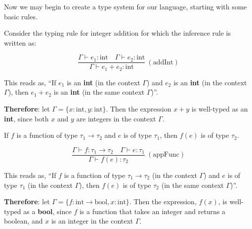 \noindent
Now we may begin to create a type system for our language, starting with some basic rules.
\begin{Example}

    \label{ex:integer_addition}
    Consider the typing rule for integer addition for which the inference rule is written as: \LARGE

    \[
    \frac{\Gamma \vdash e_1 : \text{int} \quad \Gamma \vdash e_2 : \text{int}}{\Gamma \vdash e_1 + e_2 : \text{int}} \ (\text{addInt})
    \]

    \vspace{.5em}
    \normalsize
    \noindent
    This reads as, ``If $e_1$ is an \textbf{int} (in the context $\Gamma$) and $e_2$ is an \textbf{int} 
    (in the context $\Gamma$), then $e_1 + e_2$ is an \textbf{int} (in the same context $\Gamma$)''.

    \vspace{1em}
    \noindent
    \textbf{Therefore}: let $\Gamma = \{x : \text{int}, y : \text{int}\}$. Then the expression $x + y$ is well-typed as an \textbf{int}, 
    since both $x$ and $y$ are integers in the context $\Gamma$.
\end{Example}

\vspace{-1em}
\begin{Example}

    \label{ex:function_application}
    
    If $f$ is a function of type $\tau_1 \rightarrow \tau_2$ and $e$ is of type $\tau_1$, then $f(e)$ is of type $\tau_2$.
    \LARGE

    \[
    \frac{\Gamma \vdash f : \tau_1 \rightarrow \tau_2 \quad \Gamma \vdash e : \tau_1}{\Gamma \vdash f(e) : \tau_2} \ (\text{appFunc})
    \]

    \vspace{.5em}
    \normalsize
    \noindent
    This reads as, ``If $f$ is a function of type $\tau_1 \rightarrow \tau_2$ (in the context $\Gamma$) and $e$ is of type $\tau_1$ 
    (in the context $\Gamma$), then $f(e)$ is of type $\tau_2$ (in the same context $\Gamma$)''.

    \vspace{1em}
    \noindent
    \textbf{Therefore}: let $\Gamma = \{f : \text{int} \rightarrow \text{bool}, x : \text{int}\}$. Then the expression, $f(x)$, 
    is well-typed as a \textbf{bool}, since $f$ is a function that takes an integer and returns a boolean, and $x$ is an integer 
    in the context $\Gamma$.
\end{Example}

